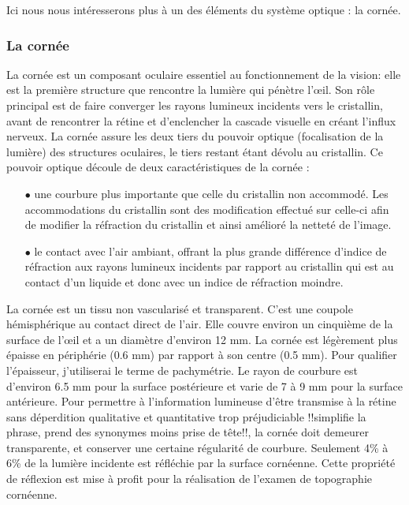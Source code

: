 \documentclass[a4paper,12pt]{article}
\begin{document}
Ici nous nous intéresserons plus à un des éléments du système optique : la cornée.



		\subsubsection{La cornée}

La cornée est un composant oculaire essentiel au fonctionnement de la vision: elle est la première structure que rencontre la lumière qui pénètre l’œil. Son rôle principal est de faire converger les rayons lumineux incidents vers le cristallin, avant de rencontrer la rétine et d'enclencher la cascade visuelle en créant l'influx nerveux. La cornée assure les deux tiers du pouvoir optique (focalisation de la lumière) des structures oculaires, le tiers restant étant dévolu au cristallin. Ce pouvoir optique découle de deux caractéristiques de la cornée : \vspace{0.15cm}
\begin{itemize}\setlength{\itemsep}{1mm}
	\item[$\bullet$] une courbure plus importante que celle du cristallin non accommodé. Les accommodations du cristallin sont des modification effectué sur celle-ci afin de modifier la réfraction du cristallin et ainsi amélioré la netteté de l'image.
	\item[$\bullet$] le contact avec l'air ambiant, offrant la plus grande différence d'indice de réfraction aux rayons lumineux incidents par rapport au cristallin qui est au contact d'un liquide et donc avec un indice de réfraction moindre. 
\end{itemize}

 \vspace{0.5cm}
La cornée est un tissu non vascularisé et transparent. C'est une coupole hémisphérique au contact direct de l'air. Elle couvre environ un cinquième de la surface de l’œil et a un diamètre d'environ 12 mm. La cornée est légèrement plus épaisse en périphérie (0.6 mm) par rapport à son centre (0.5 mm). Pour qualifier l'épaisseur, j'utiliserai le terme de pachymétrie. Le rayon de courbure est d'environ 6.5 mm pour la surface postérieure et varie de 7 à 9 mm pour la surface antérieure. Pour permettre à l'information lumineuse d'être transmise à la rétine sans déperdition qualitative et quantitative trop préjudiciable !!simplifie la phrase, prend des synonymes moins prise de tête!!, la cornée doit demeurer transparente, et conserver une certaine régularité de courbure. Seulement 4\% à 6\% de la lumière incidente est réfléchie par la surface cornéenne. Cette propriété de réflexion est mise à profit pour la réalisation de l'examen de topographie cornéenne.
\end{document}
